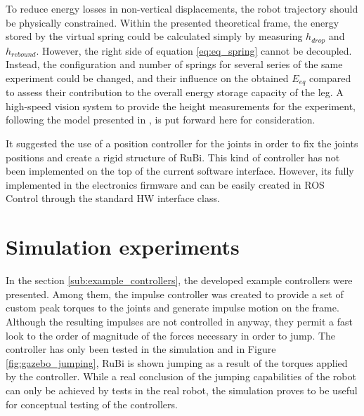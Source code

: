 To reduce energy losses in non-vertical displacements, the robot trajectory should be physically constrained.
Within the presented theoretical frame, the energy stored by the virtual spring could be calculated simply by measuring $h_{drop}$ and $h_{rebound}$.
However, the right side of equation \ref{eq:eq_spring} cannot be decoupled.
Instead, the configuration and number of springs for several series of the same experiment could be changed, and their influence on the obtained $E_{eq}$ compared to assess their contribution to the overall energy storage capacity of the leg.
A high-speed vision system to provide the height measurements for the experiment, following the model presented in \cite{hs_vision}, is put forward here for consideration. 

It suggested the use of a position controller for the joints in order to fix the joints positions and create a rigid structure of RuBi.
This kind of controller has not been implemented on the top of the current software interface.
However, its fully implemented in the electronics firmware and can be easily created in ROS Control through the standard HW interface class.


\section{Simulation experiments} %
\label{sec:simulation_experiments}
In the section \ref{sub:example_controllers}, the developed example controllers were presented.
Among them, the impulse controller was created to provide a set of custom peak torques to the joints and generate impulse motion on the frame.
Although the resulting impulses are not controlled in anyway, they permit a fast look to the order of magnitude of the forces necessary in order to jump.
The controller has only been tested in the simulation and in Figure \ref{fig:gazebo_jumping}, RuBi is shown jumping as a result of the torques applied by the controller.
While a real conclusion of the jumping capabilities of the robot can only be achieved by tests in the real robot, the simulation proves to be useful for conceptual testing of the controllers.


